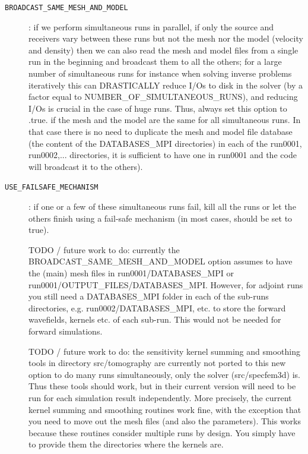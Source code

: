 \begin{description}
%
\item [{\texttt{BROADCAST\_SAME\_MESH\_AND\_MODEL}}]:
if we perform simultaneous runs in parallel, if only the source and receivers vary between these runs
but not the mesh nor the model (velocity and density) then we can also read the mesh and model files
from a single run in the beginning and broadcast them to all the others; for a large number of simultaneous
runs for instance when solving inverse problems iteratively this can DRASTICALLY reduce I/Os to disk in the solver
(by a factor equal to NUMBER\_OF\_SIMULTANEOUS\_RUNS), and reducing I/Os is crucial in the case of huge runs.
Thus, always set this option to .true. if the mesh and the model are the same for all simultaneous runs.
In that case there is no need to duplicate the mesh and model file database (the content of the DATABASES\_MPI
directories) in each of the run0001, run0002,... directories, it is sufficient to have one in run0001
and the code will broadcast it to the others).
%
\item [{\texttt{USE\_FAILSAFE\_MECHANISM}}]:
if one or a few of these simultaneous runs fail, kill all the runs or let the others finish using a fail-safe mechanism
(in most cases, should be set to true).

TODO / future work to do: currently the BROADCAST\_SAME\_MESH\_AND\_MODEL option assumes to have the (main) mesh files in run0001/DATABASES\_MPI or run0001/OUTPUT\_FILES/DATABASES\_MPI. However, for adjoint runs you still need a DATABASES\_MPI folder in each of the sub-runs directories, e.g. run0002/DATABASES\_MPI, etc. to store the forward wavefields, kernels etc. of each sub-run. This would not be needed for forward simulations.

TODO / future work to do: the sensitivity kernel summing and smoothing tools in directory src/tomography are currently not ported to this new option to do many runs simultaneously, only the solver (src/specfem3d) is. Thus these tools should work, but in their current version will need to be run for each simulation result independently.
More precisely, the current kernel summing and smoothing routines work fine, with the exception that you need to move out the mesh files (and also the parameters). This works because these routines consider multiple runs by design. You simply have to provide them the directories where the kernels are.
\end{description}
%


